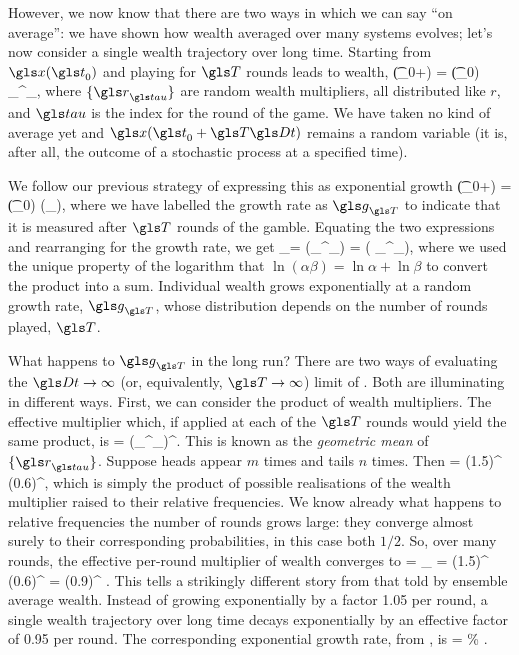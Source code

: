 However, we now know that there are two ways in which we can say ``on average'': we have shown how wealth averaged over many systems evolves; let's now consider a single wealth trajectory over long time. Starting from $\x(\t_0)$ and playing for $\T$ rounds leads to wealth,
\be
\x(\t_0+\T\Dt) = \x(\t_0) \prod_{}^\T \gr_\gtau,
\ee
where $\{\gr_\gtau\}$ are random wealth multipliers, all distributed like $r$, and $\gtau$ is the index for the round of the game. We have taken no kind of average yet and $\x(\t_0+\T\Dt)$ remains a random variable (it is, after all, the outcome of a stochastic process at a specified time).

We follow our previous strategy of expressing this as exponential growth
\be
\x(\t_0+\Dt) = \x(\t_0) \exp(\g_\T\Dt),
\ee
where we have labelled the growth rate as $\g_\T$ to indicate that it is measured after $\T$ rounds of the gamble. Equating the two expressions and rearranging for the growth rate, we get
\be
\g_\T =  \ln\left(\prod_{}^\T \gr_\gtau\right) =  \left( \sum_{}^\T \ln\gr_\gtau\right),
\ee
where we used the unique property of the logarithm that $\ln(\alpha\beta) = \ln\alpha + \ln\beta$ to convert the product into a sum. Individual wealth grows exponentially at a random growth rate, $\g_\T$, whose distribution depends on the number of rounds played, $\T$.

What happens to $\g_\T$ in the long run? There are two ways of evaluating the $\Dt\to\infty$ (or, equivalently, $\T\to\infty$) limit of . Both are illuminating in different ways. First, we can consider the product of wealth multipliers. The effective multiplier which, if applied at each of the $\T$ rounds would yield the same product, is
\be
\greff = \left(\prod_{}^\T \gr_\gtau\right)^.
\ee
This is known as the \textit{geometric mean} of $\{\gr_\gtau\}$. Suppose heads appear $m$ times and tails $n$ times. Then
\be
\greff = (1.5)^ (0.6)^,
\ee
which is simply the product of possible realisations of the wealth multiplier raised to their relative frequencies. We know already what happens to relative frequencies the number of rounds grows large: they converge almost surely to their corresponding probabilities, in this case both $1/2$. So, over many rounds, the effective per-round multiplier of wealth converges to
\be
\grtime = \lim_{\T\to\infty} \greff = (1.5)^ (0.6)^ = (0.9)^  .
\ee
This tells a strikingly different story from that told by ensemble average wealth. Instead of growing exponentially by a factor 1.05 per round, a single wealth trajectory over long time decays exponentially by an effective factor of 0.95 per round. The corresponding exponential growth rate, from , is
\be
\ggtime = \frac{\ln\grtime}{\dt} \% .
\ee

